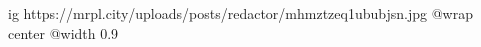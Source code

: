  
 
 
 
 

\ifcmt
  ig https://mrpl.city/uploads/posts/redactor/mhmztzeq1ububjsn.jpg
  @wrap center
  @width 0.9
\fi
